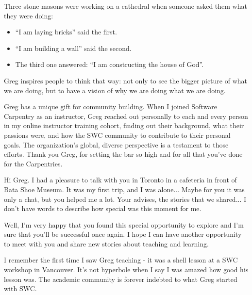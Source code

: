 
\newpage

Three stone masons were working on a cathedral when someone asked them what
they were doing:

\begin{itemize}
\item ``I am laying bricks'' said the first.
\item ``I am building a wall'' said the second.
\item The third one answered: ``I am constructing the house of God''.
\end{itemize}

Greg inspires people to think that way: not only to see the bigger picture of
what we are doing, but to have a vision of why we are doing what we are doing.


\newpage

Greg has a unique gift for community building. When I joined Software Carpentry
as an instructor, Greg reached out personally to each and every person in my
online instructor training cohort, finding out their background, what their
passions were, and how the SWC community to contribute to their personal goals.
The organization's global, diverse perspective is a testament to those efforts.
Thank you Greg, for setting the bar so high and for all that you've done for
the Carpentries.


\newpage

Hi Greg. I had a pleasure to talk with you in Toronto in a cafeteria in front
of Bata Shoe Museum. It was my first trip, and I was alone... Maybe for you it
was only a chat, but you helped me a lot. Your advises, the stories that we
shared... I don't have words to describe how special was this moment for me. 

Well, I'm very happy that you found this special opportunity to explore and I'm
sure that you'll be successful once again. I hope I can have another
opportunity to meet with you and share new stories about teaching and learning.


\newpage

I remember the first time I saw Greg teaching - it was a shell lesson at a SWC
workshop in Vancouver. It's not hyperbole when I say I was amazed how good his
lesson was. The academic community is forever indebted to what Greg started
with SWC. 

